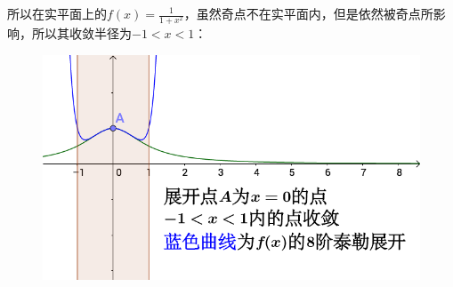 \documentclass[12pt]{article}
\begin{document}
所以在实平面上的$f(x)=\frac{1}{1+x^2}$，虽然奇点不在实平面内，但是依然被奇点所影响，所以其收敛半径为$-1 < x < 1$：
\begin{figure}[H]
  \centering
  \includegraphics[width=.8\textwidth]{fig/TaylorExpansion_12.png} 
\end{figure}



\end{document}
